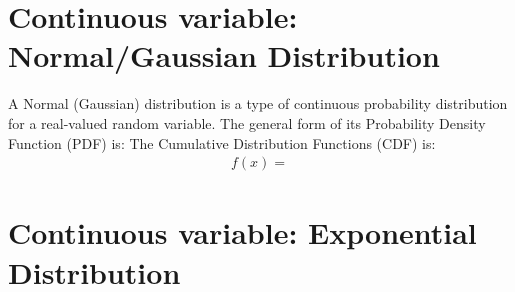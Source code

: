\section{Continuous variable: Normal/Gaussian Distribution}

A Normal (Gaussian) distribution is a type of continuous probability distribution for a real-valued random variable. The general form of its Probability Density Function (PDF) is:
The Cumulative Distribution Functions (CDF) is:
\begin{eqnarray}
f(x) = 
\label{normal_pdf}
\end{eqnarray}

\section{Continuous variable: Exponential Distribution}















